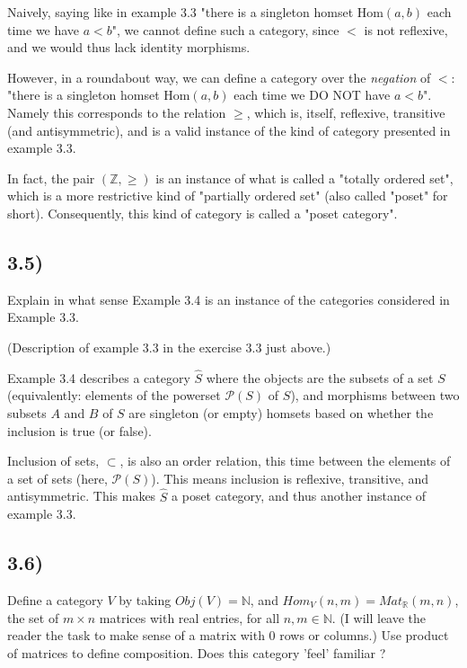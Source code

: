 \documentclass[12pt, letterpaper, twoside]{report}
\begin{document}
Naively, saying like in example 3.3 "there is a singleton homset $\text{Hom}(a,b)$ each time we have $a < b$", we cannot define such a category, since $<$ is not reflexive, and we would thus lack identity morphisms.

However, in a roundabout way, we can define a category over the \textit{negation} of $<$: "there is a singleton homset $\text{Hom}(a,b)$ each time we DO NOT have $a < b$". Namely this corresponds to the relation $\ge$, which is, itself, reflexive, transitive (and antisymmetric), and is a valid instance of the kind of category presented in example 3.3.

In fact, the pair $(\mathbb{Z}, \geq)$ is an instance of what is called a "totally ordered set", which is a more restrictive kind of "partially ordered set" (also called "poset" for short). Consequently, this kind of category is called a "poset category".



\subsection*{3.5)}

Explain in what sense Example 3.4 is an instance of the categories considered in Example 3.3.

(Description of example 3.3 in the exercise 3.3 just above.)

Example 3.4 describes a category $\hat{S}$ where the objects are the subsets of a set $S$ (equivalently: elements of the powerset $\mathcal{P}(S)$ of $S$), and morphisms between two subsets $A$ and $B$ of $S$ are singleton (or empty) homsets based on whether the inclusion is true (or false).

Inclusion of sets, $\subset$, is also an order relation, this time between the elements of a set of sets (here, $\mathcal{P}(S)$). This means inclusion is reflexive, transitive, and antisymmetric. This makes $\hat{S}$ a poset category, and thus another instance of example 3.3. 



\subsection*{3.6)}

Define a category $V$ by taking $Obj(V) = \mathbb{N}$, and $Hom_V(n, m) = Mat_\mathbb{R}(m, n)$, the set of $m \times n$ matrices with real entries, for all $n, m \in \mathbb{N}$. (I will leave the reader the task to make sense of a matrix with 0 rows or columns.) Use product of matrices to define composition. Does this
category 'feel' familiar ?
\end{document}
